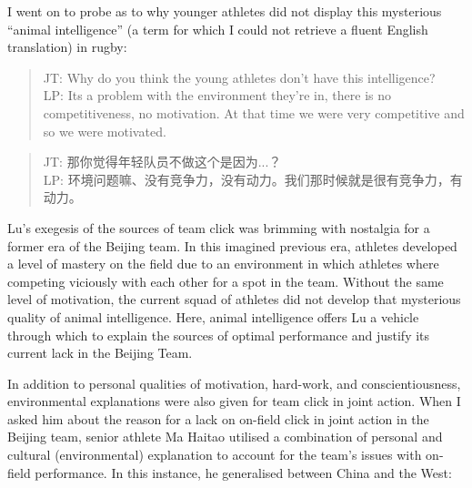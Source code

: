 \begin{CJK}{UTF8}{gbsn}
I went on to probe as to why younger athletes did not display this mysterious ``animal intelligence'' (a term for which I could not retrieve a fluent English translation) in rugby:

\begin{quote}
      JT: Why do you think the young athletes don't have this intelligence? \\
      LP: Its a problem with the environment they're in, there is no competitiveness, no motivation.  At that time we were very competitive and so we were motivated.
\end{quote}

\begin{quote}
      JT: 那你觉得年轻队员不做这个是因为...？\\
      LP: 环境问题嘛、没有竞争力，没有动力。我们那时候就是很有竞争力，有动力。
\end{quote}

Lu's exegesis of the sources of team click was brimming with nostalgia for a former era of the Beijing team.  In this imagined previous era,  athletes developed a level of mastery on the field due to an environment in which athletes where competing viciously with each other for a spot in the team.  Without the same level of motivation, the current squad of athletes did not develop that mysterious quality of animal intelligence.  Here, animal intelligence offers Lu a vehicle through which to explain the sources of optimal performance and justify its current lack in the Beijing Team.

In addition to personal qualities of motivation, hard-work, and conscientiousness, environmental explanations were also given for team click in joint action.  When I asked him about the reason for a lack on on-field click in joint action in the Beijing team, senior athlete Ma Haitao utilised a combination of personal and cultural (environmental) explanation to account for the team's issues with on-field performance.  In this instance, he generalised between China and the West:


\end{CJK}
